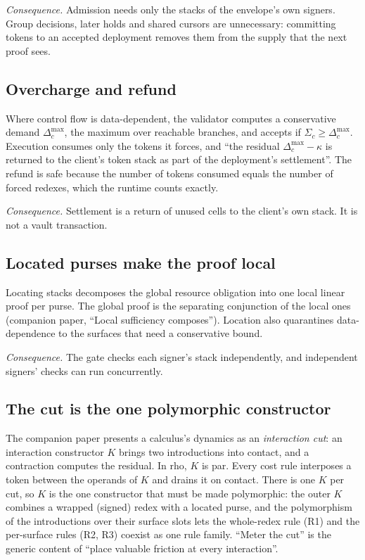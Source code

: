 \documentclass[11pt]{article}
\begin{document}
\emph{Consequence.} Admission needs only the stacks of the envelope's own signers. Group decisions, later holds and shared cursors are unnecessary: committing tokens to an accepted deployment removes them from the supply that the next proof sees.

\subsection{Overcharge and refund}

Where control flow is data-dependent, the validator computes a conservative demand $\Delta^{\max}_c$, the maximum over reachable branches, and accepts if $\Sigma_c \ge \Delta^{\max}_c$. Execution consumes only the tokens it forces, and ``the residual $\Delta^{\max}_c - \kappa$ is returned to the client's token stack as part of the deployment's settlement''. The refund is safe because the number of tokens consumed equals the number of forced redexes, which the runtime counts exactly.

\emph{Consequence.} Settlement is a return of unused cells to the client's own stack. It is not a vault transaction.

\subsection{Located purses make the proof local}

Locating stacks decomposes the global resource obligation into one local linear proof per purse. The global proof is the separating conjunction of the local ones (companion paper, ``Local sufficiency composes''). Location also quarantines data-dependence to the surfaces that need a conservative bound.

\emph{Consequence.} The gate checks each signer's stack independently, and independent signers' checks can run concurrently.

\subsection{The cut is the one polymorphic constructor}\label{sec:polycut}

The companion paper presents a calculus's dynamics as an \emph{interaction cut}: an interaction constructor $K$ brings two introductions into contact, and a contraction computes the residual. In rho, $K$ is par. Every cost rule interposes a token between the operands of $K$ and drains it on contact. There is one $K$ per cut, so $K$ is the one constructor that must be made polymorphic: the outer $K$ combines a wrapped (signed) redex with a located purse, and the polymorphism of the introductions over their surface slots lets the whole-redex rule (R1) and the per-surface rules (R2, R3) coexist as one rule family. ``Meter the cut'' is the generic content of ``place valuable friction at every interaction''.
\end{document}

